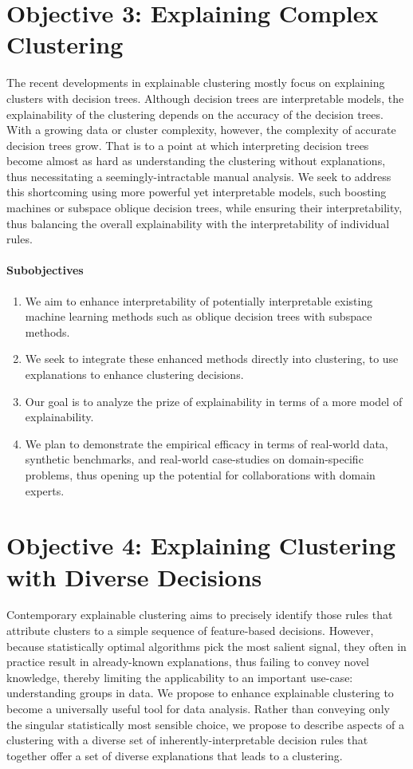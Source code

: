 \documentclass[10pt,a4paper]{article}
\begin{document}
\section{Objective 3: Explaining Complex Clustering} 

The recent developments in explainable clustering mostly focus on explaining clusters with decision trees.
Although decision trees are interpretable models, the explainability of the clustering depends on the accuracy of the decision trees.
With a growing data or cluster complexity, however, the complexity of accurate decision trees grow. 
That is to a point at which interpreting decision trees become almost as hard as understanding the clustering without explanations, thus necessitating a seemingly-intractable manual analysis.
We seek to address this shortcoming using more powerful yet interpretable models, such boosting machines or subspace oblique decision trees, while ensuring their interpretability,
thus balancing the overall explainability with the interpretability of individual rules. 

\paragraph{Subobjectives} 

\begin{enumerate}
	\item We aim to enhance interpretability of potentially interpretable existing machine learning methods such as oblique decision trees with subspace methods.
	\item We seek to integrate these enhanced methods directly into clustering, to use explanations to enhance clustering decisions.
	\item Our goal is to analyze the prize of explainability in terms of a more model of explainability.
	\item We plan to demonstrate the empirical efficacy in terms of real-world data, synthetic benchmarks, and real-world case-studies on domain-specific problems, thus opening up the potential for collaborations with domain experts.  
\end{enumerate}

\section{Objective 4: Explaining Clustering with Diverse Decisions}
Contemporary explainable clustering aims to precisely identify those rules that attribute clusters to a simple sequence of feature-based decisions.
However, because statistically optimal algorithms pick the most salient signal, 
they often in practice result in already-known explanations, thus failing to convey novel knowledge,
thereby limiting the applicability to an important use-case: understanding groups in data. 
We propose to enhance explainable clustering to become a universally useful tool for data analysis.
Rather than conveying only the singular statistically most sensible choice,
we propose to describe aspects of a clustering with a diverse set of inherently-interpretable decision rules that together offer a set of diverse explanations that leads to a clustering. 
\end{document}
